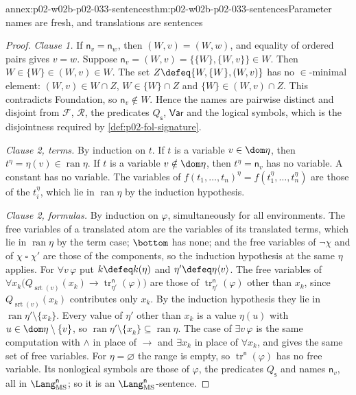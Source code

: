 \begin{annexitem}{annex:p02-w02b-p02-033-sentences}{thm:p02-w02b-p02-033-sentences}{Parameter names are fresh, and translations are sentences}
\begin{proof}
\emph{Clause 1.}  If \(\mathsf n_v=\mathsf n_w\), then \((W,v)=(W,w)\), and
equality of ordered pairs gives \(v=w\).  Suppose
\(\mathsf n_v=(W,v)=\{\{W\},\{W,v\}\}\in W\).  Then
\(W\in\{W\}\in(W,v)\in W\).  The set \(Z\defeq\{W,\{W\},(W,v)\}\) has no
\(\in\)-minimal element: \((W,v)\in W\cap Z\), \(W\in\{W\}\cap Z\) and
\(\{W\}\in(W,v)\cap Z\).  This contradicts Foundation, so
\(\mathsf n_v\notin W\).  Hence the names are pairwise distinct and disjoint
from \(\mathcal F\), \(\mathcal R\), the predicates \(Q_{\mathsf s}\),
\(\mathsf{Var}\) and the logical symbols, which is the disjointness required
by \cref{def:p02-fol-signature}.

\emph{Clause 2, terms.}  By induction on \(t\).  If \(t\) is a variable
\(v\in\dom\eta\), then \(t^{\eta}=\eta(v)\in\operatorname{ran}\eta\).  If
\(t\) is a variable \(v\notin\dom\eta\), then \(t^{\eta}=\mathsf n_v\) has no
variable.  A constant has no variable.  The variables of
\(f(t_1,\ldots,t_n)^{\eta}=f(t_1^{\eta},\ldots,t_n^{\eta})\) are those of the
\(t_i^{\eta}\), which lie in \(\operatorname{ran}\eta\) by the induction
hypothesis.

\emph{Clause 2, formulas.}  By induction on \(\varphi\), simultaneously for
all environments.  The free variables of a translated atom are the variables
of its translated terms, which lie in \(\operatorname{ran}\eta\) by the term
case; \(\bottom\) has none; and the free variables of
\(\neg\chi\) and of \(\chi\mathbin{\square}\chi'\) are those of the
components, so the induction hypothesis at the same \(\eta\) applies.  For
\(\forall v\,\varphi\) put \(k\defeq k(\eta)\) and
\(\eta'\defeq\eta\langle v\rangle\).  The free variables of
\(\forall x_k\bigl(Q_{\operatorname{srt}(v)}(x_k)\to
\operatorname{tr}^{\mathsf n}_{\eta'}(\varphi)\bigr)\) are those of
\(\operatorname{tr}^{\mathsf n}_{\eta'}(\varphi)\) other than \(x_k\), since
\(Q_{\operatorname{srt}(v)}(x_k)\) contributes only \(x_k\).  By the induction
hypothesis they lie in \(\operatorname{ran}\eta'\setminus\{x_k\}\).  Every
value of \(\eta'\) other than \(x_k\) is a value \(\eta(u)\) with
\(u\in\dom\eta\setminus\{v\}\), so
\(\operatorname{ran}\eta'\setminus\{x_k\}\subseteq\operatorname{ran}\eta\).
The case of \(\exists v\,\varphi\) is the same computation with \(\land\) in
place of \(\to\) and \(\exists x_k\) in place of \(\forall x_k\), and gives
the same set of free variables.  For \(\eta=\varnothing\) the range is empty,
so \(\operatorname{tr}^{\mathsf n}(\varphi)\) has no free variable.  Its
nonlogical symbols are those of \(\varphi\), the predicates
\(Q_{\mathsf s}\) and names \(\mathsf n_v\), all in
\(\Lang_{\mathrm{MS}}^{\mathsf n}\); so it is an
\(\Lang_{\mathrm{MS}}^{\mathsf n}\)-sentence.
\end{proof}
\end{annexitem}

